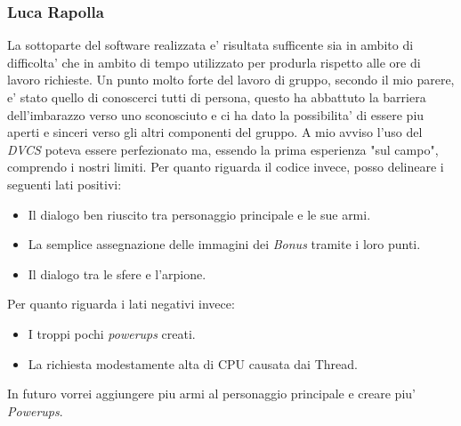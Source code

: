 \documentclass[a4paper,12pt]{report}
\begin{document}
\subsubsection{Luca Rapolla}
La sottoparte del software realizzata e' risultata sufficente sia in ambito di difficolta' che in ambito di tempo utilizzato per produrla rispetto alle ore di lavoro richieste.
Un punto molto forte del lavoro di gruppo, secondo il mio parere, e' stato quello di conoscerci tutti di persona, questo ha abbattuto la barriera dell'imbarazzo verso uno sconosciuto e ci ha dato la possibilita' di essere piu aperti e sinceri verso gli altri componenti del gruppo.
A mio avviso l'uso del \emph{DVCS} poteva essere perfezionato ma, essendo la prima esperienza "sul campo", comprendo i nostri limiti.
Per quanto riguarda il codice invece, posso delineare i seguenti lati positivi:
\begin{itemize}
    \item Il dialogo ben riuscito tra personaggio principale e le sue armi.
    \item La semplice assegnazione delle immagini dei \emph{Bonus} tramite i loro punti.
    \item Il dialogo tra le sfere e l'arpione.
\end{itemize}

Per quanto riguarda i lati negativi invece:
\begin{itemize}
    \item I troppi pochi \emph{powerups} creati.
    \item La richiesta modestamente alta di CPU causata dai Thread.
\end{itemize}

In futuro vorrei aggiungere piu armi al personaggio principale e creare piu' \emph{Powerups}.
\end{document}

